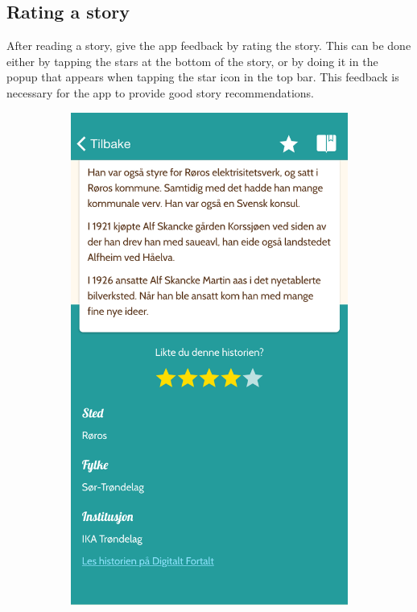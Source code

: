 \begin{appendices}
\section{Rating a story}
After reading a story, give the app feedback by rating the story. This can be done either by tapping the stars at the bottom of the story, or by doing it in the popup that appears when tapping the star icon in the top bar. This feedback is necessary for the app to provide good story recommendations. 
\begin{figure}[h!]
		\centering
		\begin{subfigure}[h]{0.32\textwidth}
			\includegraphics[width=\textwidth]{fig/screenshot_story2}

\end{subfigure}
\end{figure}
\end{appendices}
